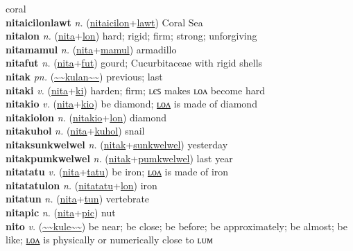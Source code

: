 coral \label{nitaicilon} \\
\textbf{nitaicilonlawt} \textit{n.} (\hyperref[nitaicilon]{nitaicilon}+\hyperref[lawt]{lawt})
Coral Sea \label{nitaicilonlawt} \\
\textbf{nitalon} \textit{n.} (\hyperref[nita]{nita}+\hyperref[lon]{lon})
hard; rigid; firm; strong; unforgiving \label{nitalon} \\
\textbf{nitamamul} \textit{n.} (\hyperref[nita]{nita}+\hyperref[mamul]{mamul})
armadillo \label{nitamamul} \\
\textbf{nitafut} \textit{n.} (\hyperref[nita]{nita}+\hyperref[fut]{fut})
gourd; Cucurbitaceae with rigid shells \label{nitafut} \\
\textbf{nitak} \textit{pn.} (\hyperref[kulan]{\~{}\~{}kulan\~{}\~{}})
previous; last \label{nitak} \\
\textbf{nitaki} \textit{v.} (\hyperref[nita]{nita}+\hyperref[ki]{ki})
harden; firm; ʟєꜱ makes ʟᴏᴧ become hard \label{nitaki} \\
\textbf{nitakio} \textit{v.} (\hyperref[nita]{nita}+\hyperref[kio]{kio})
be diamond; \hyperref[nitakiolon]{ʟᴏᴧ} is made of diamond \label{nitakio} \\
\textbf{nitakiolon} \textit{n.} (\hyperref[nitakio]{nitakio}+\hyperref[lon]{lon})
diamond \label{nitakiolon} \\
\textbf{nitakuhol} \textit{n.} (\hyperref[nita]{nita}+\hyperref[kuhol]{kuhol})
snail \label{nitakuhol} \\
\textbf{nitaksunkwelwel} \textit{n.} (\hyperref[nitak]{nitak}+\hyperref[sunkwelwel]{sunkwelwel})
yesterday \label{nitaksunkwelwel} \\
\textbf{nitakpumkwelwel} \textit{n.} (\hyperref[nitak]{nitak}+\hyperref[pumkwelwel]{pumkwelwel})
last year \label{nitakpumkwelwel} \\
\textbf{nitatatu} \textit{v.} (\hyperref[nita]{nita}+\hyperref[tatu]{tatu})
be iron; \hyperref[nitatatulon]{ʟᴏᴧ} is made of iron \label{nitatatu} \\
\textbf{nitatatulon} \textit{n.} (\hyperref[nitatatu]{nitatatu}+\hyperref[lon]{lon})
iron \label{nitatatulon} \\
\textbf{nitatun} \textit{n.} (\hyperref[nita]{nita}+\hyperref[tun]{tun})
vertebrate \label{nitatun} \\
\textbf{nitapic} \textit{n.} (\hyperref[nita]{nita}+\hyperref[pic]{pic})
nut \label{nitapic} \\
\textbf{nito} \textit{v.} (\hyperref[kule]{\~{}\~{}kule\~{}\~{}})
be near; be close; be before; be approximately; be almost; be like; \hyperref[nitolon]{ʟᴏᴧ} is physically or numerically close to ʟᴜᴍ \label{nito} \\
